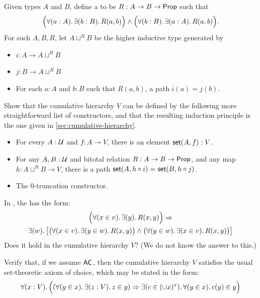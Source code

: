 \begin{ex}\label{ex:cumhierhit}
  Given types $A$ and $B$, define a 
  to be $R:A\to B\to \mathsf{Prop}$ such that
  \[ \Big(\fall{a:A}\exis{b:B} R(a,b) \Big) \land \Big(\fall{b:B}\exis{a:A} R(a,b) \Big). \]
  For such $A,B,R$, let $A\sqcup^R B$ be the higher inductive type generated by
  \begin{itemize}
  \item $i:A\to A\sqcup^R B$
  \item $j:B\to A\sqcup^R B$
  \item For each $a:A$ and $b:B$ such that $R(a,b)$, a path $i(a)=j(b)$.
  \end{itemize}
  Show that the cumulative hierarchy $V$ can be defined by the following more straightforward list of constructors, and that the resulting induction principle is the one given in \cref{sec:cumulative-hierarchy}.
  \begin{itemize}
  \item For every $A : \mathcal{U}$ and $f : A \to V$, there is an element $\mathsf{set}(A, f) : V$.
  \item For any $A,B:\mathcal{U}$ and bitotal relation
    $R:A\to B\to \mathsf{Prop}$, and any map $h:A\sqcup^R B \to V$, there is a path $\mathsf{set}(A,h\circ i) =_{} \mathsf{set}(B,h\circ j)$.
  \item The 0-truncation constructor.
  \end{itemize}
\end{ex}

\begin{ex}\label{ex:strong-collection}
  In \CZF, the 
  has the form:
   \begin{multline*}
   \Parens{\fall{x\in v}\exis{y} R(x,y)} \Rightarrow \\
   \exis{w}\big[\big(\fall{x\in v}\exis{y\in w}R(x,y)\big)\land \big(\fall{y\in w}\exis{x\in v}R(x,y) \big)\big]
   \end{multline*}
   Does it hold in the cumulative hierarchy $V$?  (We do not know the answer to this.)
\end{ex}

\begin{ex}\label{ex:choice-cumulative-hierarchy-choice}
Verify that, if we assume $\mathsf{AC}_{}$, then the cumulative hierarchy $V$ satisfies the usual set-theoretic axiom of choice, which may be stated in the form:
  \[
   \fall{x:V} \Parens{(\fall{y\in x}\exis{z:V} z\in y) \Rightarrow  \exis{c\in(\cup x)^x}\fall{y\in x} c(y)\in y}
   \]
\end{ex}

